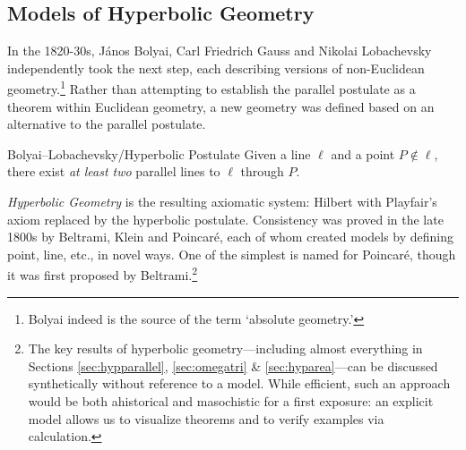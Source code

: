 \clearpage



\subsection{Models of Hyperbolic Geometry}\label{sec:hyp-models}

In the 1820-30s, János Bolyai, Carl Friedrich Gauss and Nikolai Lobachevsky independently took the next step, each describing versions of non-Euclidean geometry.\footnote{Bolyai indeed is the source of the term `absolute geometry.'} Rather than attempting to establish the parallel postulate as a theorem within Euclidean geometry, a new geometry was defined based on an alternative to the parallel postulate.

\begin{axiom}{Bolyai--Lobachevsky/Hyperbolic Postulate}{}
	Given a line $\ell$ and a point $P\not\in\ell$, there exist \emph{at least two} parallel lines to $\ell$ through $P$.
\end{axiom}

\emph{Hyperbolic Geometry} is the resulting axiomatic system: Hilbert with Playfair's axiom replaced by the hyperbolic postulate. Consistency was proved in the late 1800s by Beltrami, Klein and Poincaré, each of whom created models by defining point, line, etc., in novel ways. One of the simplest is named for Poincaré, though it was first proposed by Beltrami.\footnote{%
	The key results of hyperbolic geometry---including almost everything in Sections \ref{sec:hypparallel}, \ref{sec:omegatri} \& \ref{sec:hyparea}---can be discussed synthetically without reference to a model. While efficient, such an approach would be both ahistorical and masochistic for a first exposure: an explicit model allows us to visualize theorems and to verify examples via calculation.
}

